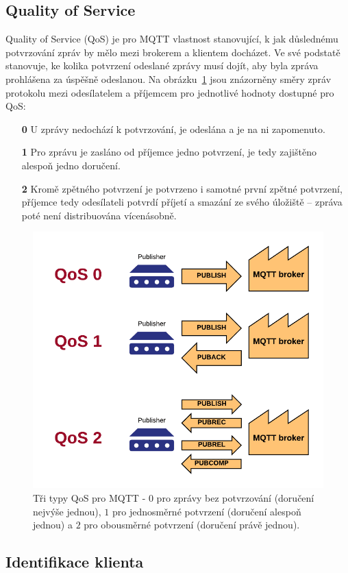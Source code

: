 \subsection{Quality of Service}\label{subsec:quality-of-service}
Quality of Service (QoS) je pro MQTT vlastnost stanovující, k jak důslednému potvrzování zpráv by mělo mezi
brokerem a klientem docházet.
Ve své podstatě stanovuje, ke kolika potvrzení odeslané zprávy musí dojít, aby byla
zpráva prohlášena za úspěšně odeslanou.
Na obrázku~\ref{fig:mqtt-qos} jsou znázorněny směry zpráv protokolu mezi odesílatelem a příjemcem pro jednotlivé
hodnoty dostupné pro QoS:

\begin{enumerate}
    \item[\textbf{0}] U zprávy nedochází k potvrzování, je odeslána a je na ni zapomenuto.
    \item[\textbf{1}] Pro zprávu je zasláno od příjemce jedno potvrzení, je tedy zajištěno alespoň jedno doručení.
    \item[\textbf{2}] Kromě zpětného potvrzení je potvrzeno i samotné první zpětné potvrzení, příjemce tedy
    odesílateli potvrdí příjetí a smazání ze svého úložiště -- zpráva poté není distribuována vícenásobně.
\end{enumerate}

\begin{figure}
    \centering
    \includegraphics[width=.5\textwidth]{figures/mqtt-qos.png}
    \caption{Tři typy QoS pro MQTT - $0$ pro zprávy bez potvrzování (doručení nejvýše jednou), $1$ pro jednosměrné potvrzení (doručení alespoň jednou) a $2$ pro obousměrné potvrzení (doručení právě jednou).}
    \label{fig:mqtt-qos}
\end{figure}

\subsection{Identifikace klienta }\label{subsec:identifikace-klienta-client-id}


